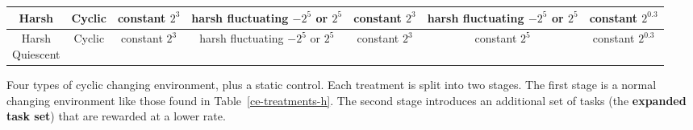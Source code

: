 \documentclass[10pt,letterpaper]{article}
\begin{document}
\begin{table}[]
\begin{tabular}{|c|c||c|c||c|c|c|}
	Harsh & Cyclic & \makecell{constant \\ $2^3$} & \makecell{harsh \\ fluctuating \\ $-2^5$ or $2^5$} & \makecell{constant \\ $2^3$} & \makecell{harsh \\ fluctuating \\ $-2^5$ or $2^5$} & \makecell{constant \\ $2^{0.3}$} \\\hline
	\makecell{Harsh \\ Quiescent} & Cyclic & \makecell{constant \\ $2^3$} & \makecell{harsh \\ fluctuating \\ $-2^5$ or $2^5$} & \makecell{constant \\ $2^3$} & \makecell{constant \\ $2^5$} & \makecell{constant \\ $2^{0.3}$} \\\hline
	\end{tabular} 

	\begin{flushleft} Four types of cyclic changing environment, plus a static control. Each treatment is split into two stages. The first stage is a normal changing environment like those found in Table~\ref{ce-treatments-h}. The second stage introduces an additional set of tasks (the \textbf{expanded task set}) that are rewarded at a lower rate.
	\end{flushleft}
	\label{cel-treatments-simple}
	\end{table}
\end{document}
